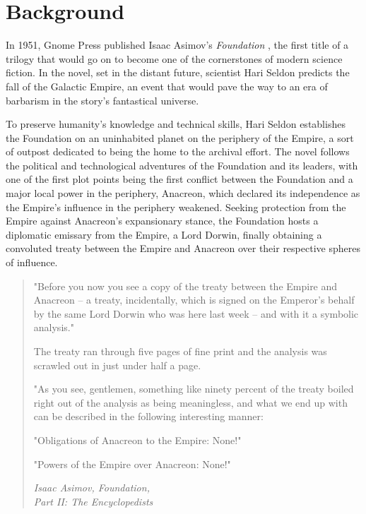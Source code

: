 \section{Background}
\label{sec:background}

In 1951, Gnome Press published Isaac Asimov's \emph{Foundation} \citep{asimov1951foundation}, the first title of a trilogy that would go on to become one of the cornerstones of modern science fiction.
In the novel, set in the distant future, scientist Hari Seldon predicts the fall of the Galactic Empire, an event that would pave the way to an era of barbarism in the story's fantastical universe.

To preserve humanity's knowledge and technical skills, Hari Seldon establishes the Foundation on an uninhabited planet on the periphery of the Empire, a sort of outpost dedicated to being the home to the archival effort.
The novel follows the political and technological adventures of the Foundation and its leaders, with one of the first plot points being the first conflict between the Foundation and a major local power in the periphery, Anacreon, which declared its independence as the Empire's influence in the periphery weakened.
Seeking protection from the Empire against Anacreon's expansionary stance, the Foundation hosts a diplomatic emissary from the Empire, a Lord Dorwin, finally obtaining a convoluted treaty between the Empire and Anacreon over their respective spheres of influence.

\begin{quote}
    "Before you now you see a copy of the treaty between the Empire and Anacreon – a treaty, incidentally, which is signed on the Emperor's behalf by the same Lord Dorwin who was here last week – and with it a symbolic analysis."

    The treaty ran through five pages of fine print and the analysis was scrawled out in just under half a page.

    "As you see, gentlemen, something like ninety percent of the treaty boiled right out of the analysis as being meaningless, and what we end up with can be described in the following interesting manner:

    "Obligations of Anacreon to the Empire: None!"

    "Powers of the Empire over Anacreon: None!"

    \vspace{0.2cm}

    \begin{flushright}
        \small \emph{Isaac Asimov, Foundation,\\Part II: The Encyclopedists}
    \end{flushright}
\end{quote}

